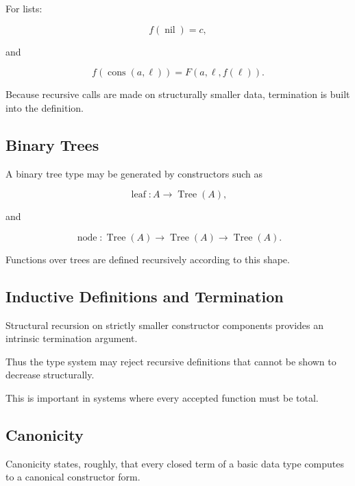 For lists:

\[
f(\operatorname{nil})
=
c,
\]

and

\[
f(\operatorname{cons}(a,\ell))
=
F(a,\ell,f(\ell)).
\]

Because recursive calls are made on structurally smaller data, termination
is built into the definition.

\subsection{Binary Trees}
\label{subsec:type-theory-binary-trees}

A binary tree type may be generated by constructors such as

\[
\boxed{
\operatorname{leaf}:A\to\operatorname{Tree}(A),
}
\]

and

\[
\boxed{
\operatorname{node}:
\operatorname{Tree}(A)
\to
\operatorname{Tree}(A)
\to
\operatorname{Tree}(A).
}
\]

Functions over trees are defined recursively according to this shape.

\subsection{Inductive Definitions and Termination}
\label{subsec:inductive-definition-termination}

Structural recursion on strictly smaller constructor components provides an
intrinsic termination argument.

Thus the type system may reject recursive definitions that cannot be shown
to decrease structurally.

This is important in systems where every accepted function must be total.

\subsection{Canonicity}
\label{subsec:type-theory-canonicity}

Canonicity states, roughly, that every closed term of a basic data type
computes to a canonical constructor form.

